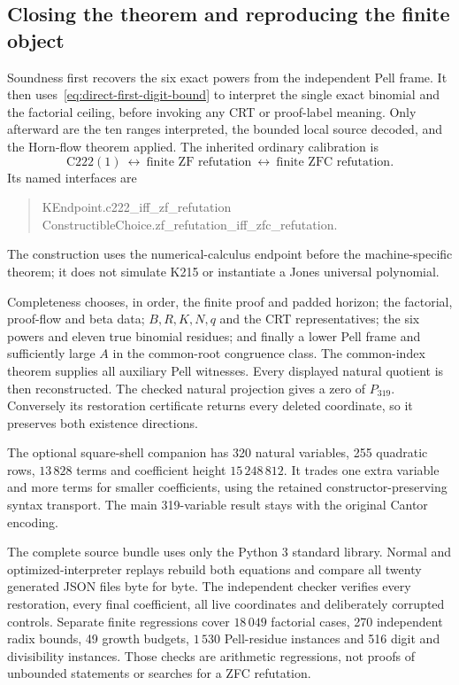 \subsection{Closing the theorem and reproducing the finite object}

Soundness first recovers the six exact powers from the independent Pell
frame. It then uses~\eqref{eq:direct-first-digit-bound} to interpret the
single exact binomial and the factorial ceiling, before invoking any CRT
or proof-label meaning. Only afterward are the ten ranges interpreted,
the bounded local source decoded, and the Horn-flow theorem applied.
The inherited ordinary calibration is
\[
 \mathrm{C222}(1)\ \longleftrightarrow\
 \text{finite ZF refutation}\ \longleftrightarrow\
 \text{finite ZFC refutation}.
\]
Its named interfaces are
\begin{quote}\small\ttfamily
KEndpoint.c222\_iff\_zf\_refutation\\
ConstructibleChoice.zf\_refutation\_iff\_zfc\_refutation.
\end{quote}
The construction uses the numerical-calculus endpoint before the
machine-specific theorem; it does not simulate K215 or instantiate a
Jones universal polynomial.

Completeness chooses, in order, the finite proof and padded horizon;
the factorial, proof-flow and beta data; $B,R,K,N,q$ and the CRT
representatives; the six powers and eleven true binomial residues; and
finally a lower Pell frame and sufficiently large $A$ in the common-root
congruence class. The common-index theorem supplies all auxiliary Pell
witnesses. Every displayed natural quotient is then reconstructed.
The checked natural projection gives a zero of $P_{319}$. Conversely
its restoration certificate returns every deleted coordinate, so it
preserves both existence directions.

The optional square-shell companion has 320 natural variables, 255
quadratic rows, $13\,828$ terms and coefficient height $15\,248\,812$.
It trades one extra variable and more terms for smaller coefficients,
using the retained constructor-preserving syntax transport. The main
319-variable result stays with the original Cantor encoding.

The complete source bundle uses only the Python 3 standard library.
Normal and optimized-interpreter replays rebuild both equations and
compare all twenty generated JSON files byte for byte. The independent
checker verifies every restoration, every final coefficient, all live
coordinates and deliberately corrupted controls. Separate finite
regressions cover $18\,049$ factorial cases, 270 independent radix
bounds, 49 growth budgets, $1\,530$ Pell-residue instances and 516 digit
and divisibility instances. Those checks are arithmetic regressions,
not proofs of unbounded statements or searches for a ZFC refutation.
